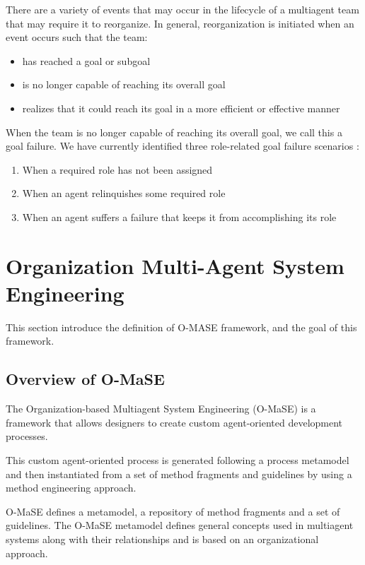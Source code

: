 There are a variety of events that may occur in the lifecycle of a multiagent team that may require it to reorganize. In
general, reorganization is initiated when an event occurs such that the team\cite{omacs1}:
\begin{itemize}
\newcommand{\localtextbulletone}{\textcolor{gray}{\raisebox{.45ex}{\rule{.6ex}{.6ex}}}}
\renewcommand{\labelitemi}{\localtextbulletone}
	\item has reached a goal or subgoal
	\item is no longer capable of reaching its overall goal
	\item realizes that it could reach its goal in a more efficient or effective manner
\end{itemize}
 

When the team is no longer capable of reaching its overall goal, 
we call this a goal failure. We have currently identified three role-related goal failure
scenarios \cite{omacs1}:

\begin{enumerate}
	\item When a required role has not been assigned
	\item When an agent relinquishes some required role
	\item When an agent suffers a failure that keeps it from accomplishing its role 
\end{enumerate}
\pagebreak

\section{Organization Multi-Agent System Engineering}
This section introduce the definition of O-MASE framework, and the goal of this framework. 
\subsection{Overview of O-MaSE}
The Organization-based Multiagent System Engineering (O-MaSE) is a framework that 
 allows designers to create custom agent-oriented development processes. 
 
This custom agent-oriented process is generated following a process metamodel 
and then instantiated from a set of method fragments and guidelines 
by using a method engineering approach. 

O-MaSE defines a metamodel, a repository of method fragments and a set of guidelines. 
The O-MaSE metamodel defines general concepts used in multiagent systems
along with their relationships and is based on an organizational approach\cite{omacs6}.
 
